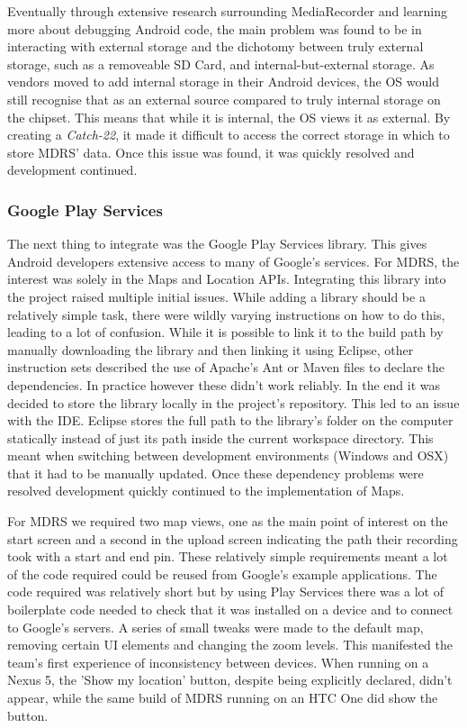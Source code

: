 \documentclass{l3proj}
\begin{document}
Eventually through extensive research surrounding MediaRecorder and learning more about debugging Android code, the main problem was found to be in interacting with external storage and the dichotomy between truly external storage, such as a removeable SD Card, and internal-but-external storage. As vendors moved to add internal storage in their Android devices, the OS would still recognise that as an external source compared to truly internal storage on the chipset. This means that while it is internal, the OS views it as external. By creating a \textit{Catch-22}, it made it difficult to access the correct storage in which to store MDRS' data. Once this issue was found, it was quickly resolved and development continued.

\subsubsection{Google Play Services}    The next thing to integrate was the Google Play Services library. This gives Android developers extensive access to many of Google's services. For MDRS, the interest was solely in the Maps and Location APIs. Integrating this library into the project raised multiple initial issues. While adding a library should be a relatively simple task, there were wildly varying instructions on how to do this, leading to a lot of confusion. While it is possible to link it to the build path by manually downloading the library and then linking it using Eclipse, other instruction sets described the use of Apache's Ant or Maven files to declare the dependencies. In practice however these didn't work reliably. In the end it was decided to store the library locally in the project's repository. This led to an issue with the IDE. Eclipse stores the full path to the library's folder on the computer statically instead of just its path inside the current workspace directory. This meant when switching between development environments (Windows and OSX) that it had to be manually updated. Once these dependency problems were resolved development quickly continued to the implementation of Maps.

For MDRS we required two map views, one as the main point of interest on the start screen and a second in the upload screen indicating the path their recording took with a start and end pin. These relatively simple requirements meant a lot of the code required could be reused from Google's example applications. The code required was relatively short but by using Play Services there was a lot of boilerplate code needed to check that it was installed on a device and to connect to Google's servers. A series of small tweaks were made to the default map, removing certain UI elements and changing the zoom levels. This manifested the team's first experience of inconsistency between devices. When running on a Nexus 5, the 'Show my location' button, despite being explicitly declared, didn't appear, while the same build of MDRS running on an HTC One did show the button.
\end{document}
